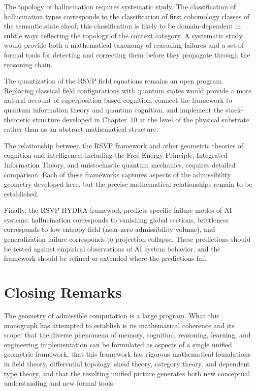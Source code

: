 \documentclass[12pt, a4paper, openany]{book}
\theoremstyle{plain}
\theoremstyle{definition}
\theoremstyle{remark}
\begin{document}
The topology of hallucination requires systematic study. The classification of hallucination types corresponds to the classification of first cohomology classes of the semantic state sheaf; this classification is likely to be domain-dependent in subtle ways reflecting the topology of the context category. A systematic study would provide both a mathematical taxonomy of reasoning failures and a set of formal tools for detecting and correcting them before they propagate through the reasoning chain.

The quantization of the RSVP field equations remains an open program. Replacing classical field configurations with quantum states would provide a more natural account of superposition-based cognition, connect the framework to quantum information theory and quantum cognition, and implement the stack-theoretic structure developed in Chapter~10 at the level of the physical substrate rather than as an abstract mathematical structure.

The relationship between the RSVP framework and other geometric theories of cognition and intelligence, including the Free Energy Principle, Integrated Information Theory, and unistochastic quantum mechanics, requires detailed comparison. Each of these frameworks captures aspects of the admissibility geometry developed here, but the precise mathematical relationships remain to be established.

Finally, the RSVP-HYDRA framework predicts specific failure modes of AI systems: hallucination corresponds to vanishing global sections, brittleness corresponds to low entropy field (near-zero admissibility volume), and generalization failure corresponds to projection collapse. These predictions should be tested against empirical observations of AI system behavior, and the framework should be refined or extended where the predictions fail.

\section{Closing Remarks}

The geometry of admissible computation is a large program. What this monograph has attempted to establish is its mathematical coherence and its scope: that the diverse phenomena of memory, cognition, reasoning, learning, and engineering implementation can be formulated as aspects of a single unified geometric framework, that this framework has rigorous mathematical foundations in field theory, differential topology, sheaf theory, category theory, and dependent type theory, and that the resulting unified picture generates both new conceptual understanding and new formal tools.
\end{document}
